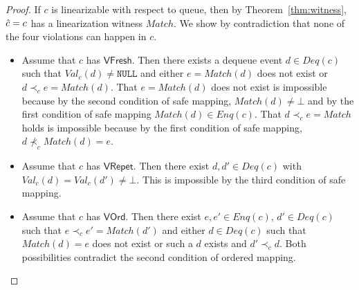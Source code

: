 \documentclass{LMCS}
\newcommand{\NULL}{\ensuremath{\mathtt{NULL}}}
\newcommand{\Match}{\ensuremath{\mathit{Match}}}
\newcommand{\Deq}[1]{\ensuremath{\mathit{Deq}({#1})}}
\newcommand{\Enq}[1]{\ensuremath{\mathit{Enq}({#1})}}
\newcommand{\Val}[2]{\ensuremath{\mathit{Val}_{#1}({#2})}}
\newcommand{\compl}{\ensuremath{\hat}}
\newcommand{\VFresh}{\ensuremath{\mathsf{VFresh}}}
\newcommand{\VRepet}{\ensuremath{\mathsf{VRepet}}}
\newcommand{\VOrd}{\ensuremath{\mathsf{VOrd}}}
\begin{document}
\begin{proof}\hfill

\noindent{\bf($\Rightarrow$)} If $c$ is linearizable with respect to queue, then by Theorem~\ref{thm:witness}, $\compl{c}=c$ has a linearization witness $\Match$.
We show by contradiction that none of the four violations can happen in $c$.

\begin{itemize}
\item Assume that $c$ has \VFresh.
Then there exists a dequeue event $d\in \Deq c$ such that $\Val c d\neq \NULL$ and either $e=\Match(d)$ does not exist or $d\prec_c e=\Match(d)$.
That $e=\Match(d)$ does not exist is impossible because by the second condition of safe mapping, $\Match(d)\neq\bot$ and by the first condition of safe mapping $\Match(d)\in \Enq c$.
That $d\prec_c e=\Match$ holds is impossible because by the first condition of safe mapping, $d\not\prec_c \Match(d)=e$.

\item Assume that $c$ has \VRepet.
Then there exist $d,d'\in \Deq c$ with $\Val c d=\Val c {d'}\neq \bot$.
This is impossible by the third condition of safe mapping.

\item Assume that $c$ has \VOrd.
Then there exist $e,e'\in \Enq c$, $d'\in \Deq c$ such that $e\prec_c e'=\Match(d')$ and either $d\in \Deq c$ such that $\Match(d)=e$ does not exist or such a $d$ exists and $d'\prec_c d$.
Both possibilities contradict the second condition of ordered mapping.


\end{itemize}
\end{proof}
\end{document}
